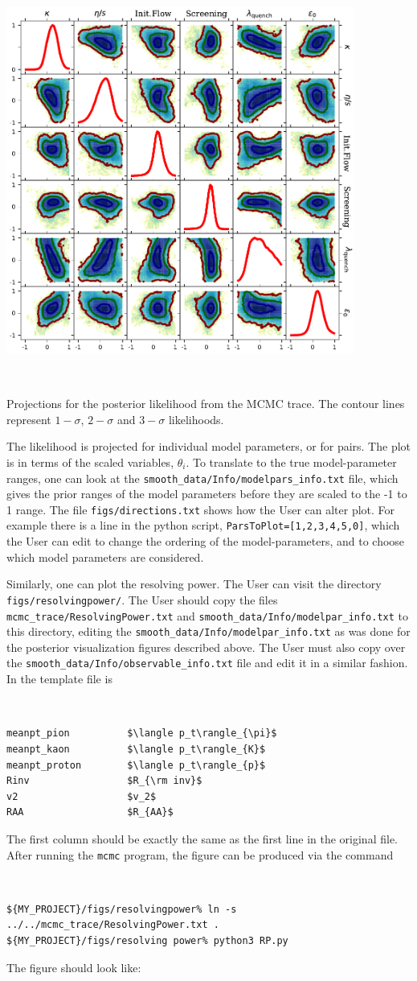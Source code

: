 \documentclass[UserManual.tex]{subfiles}
\begin{document}
\parbox{4.5in}{\centerline{\includegraphics[width=4.5in]{posterior_rhic.pdf}}}
~~\parbox{2.0in}{Projections for the posterior likelihood from the MCMC trace. The contour lines represent $1-\sigma$, $2-\sigma$ and $3-\sigma$ likelihoods.}

The likelihood is projected for individual model parameters, or for pairs. The plot is in terms of the scaled variables, $\theta_i$. To translate to the true model-parameter ranges, one can look at the {\tt smooth\_data/Info/modelpars\_info.txt} file, which gives the prior ranges of the model parameters before they are scaled to the -1 to 1 range. The file {\tt figs/directions.txt} shows how the User can alter plot. For example there is a line in the python script, {\tt ParsToPlot=[1,2,3,4,5,0]}, which the User can edit to change the ordering of the model-parameters, and to choose which model parameters are considered.

Similarly, one can plot the resolving power. The User can visit the directory {\tt figs/resolvingpower/}. The User should copy the files {\tt mcmc\_trace/ResolvingPower.txt} and {\tt smooth\_data/Info/modelpar\_info.txt} to this directory, editing the {\tt smooth\_data/Info/modelpar\_info.txt} as was done for the posterior visualization figures described above. The User must also copy over the {\tt smooth\_data/Info/observable\_info.txt} file and edit it in a similar fashion. In the template file is
{\tt
\begin{verbatim}
meanpt_pion          $\langle p_t\rangle_{\pi}$
meanpt_kaon          $\langle p_t\rangle_{K}$
meanpt_proton        $\langle p_t\rangle_{p}$
Rinv                 $R_{\rm inv}$
v2                   $v_2$
RAA                  $R_{AA}$
\end{verbatim}}
The first column should be exactly the same as the first line in the original file. After running the {\tt mcmc} program, the figure can be produced via the command
{\tt
\begin{verbatim}
${MY_PROJECT}/figs/resolvingpower% ln -s ../../mcmc_trace/ResolvingPower.txt .
${MY_PROJECT}/figs/resolving power% python3 RP.py
\end{verbatim}}
The figure should look like:
\end{document}
